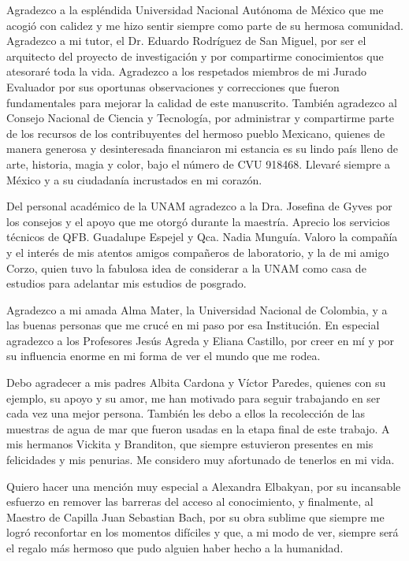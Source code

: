\begin{acknowledgements}
Agradezco a la espléndida Universidad Nacional Autónoma de México que me acogió con calidez y me hizo sentir siempre como parte de su hermosa comunidad. Agradezco a mi tutor, el Dr. Eduardo Rodríguez de San Miguel, por ser el arquitecto del proyecto de investigación y por compartirme conocimientos que atesoraré toda la vida. Agradezco a los respetados miembros de mi Jurado Evaluador por sus oportunas observaciones y correcciones que fueron fundamentales para mejorar la calidad de este manuscrito. También agradezco al Consejo Nacional de Ciencia y Tecnología, por administrar y compartirme parte de los recursos de los contribuyentes del hermoso pueblo Mexicano, quienes de manera generosa y desinteresada financiaron mi estancia es su lindo país lleno de arte, historia, magia y color, bajo el número de CVU 918468. Llevaré siempre a México y a su ciudadanía incrustados en mi corazón. 

Del personal académico de la UNAM agradezco a la Dra. Josefina de Gyves por los consejos y el apoyo que me otorgó durante la maestría. Aprecio los servicios técnicos de QFB. Guadalupe Espejel y Qca. Nadia Munguía. Valoro la compañía y el interés de mis atentos amigos compañeros de laboratorio, y la de mi amigo Corzo, quien tuvo la fabulosa idea de considerar a la UNAM como casa de estudios para adelantar mis estudios de posgrado.

Agradezco a mi amada Alma Mater, la Universidad Nacional de Colombia, y a las buenas personas que me crucé en mi paso por esa Institución. En especial agradezco a los Profesores Jesús Agreda y Eliana Castillo, por creer en mí y por su influencia enorme en mi forma de ver el mundo que me rodea.

Debo agradecer a mis padres Albita Cardona y Víctor Paredes, quienes con su ejemplo, su apoyo y su amor, me han motivado para seguir trabajando en ser cada vez una mejor persona. También les debo a ellos la recolección de las muestras de agua de mar que fueron usadas en la etapa final de este trabajo. A mis hermanos Vickita y Branditon, que siempre estuvieron presentes en mis felicidades y mis penurias. Me considero muy afortunado de tenerlos en mi vida. 

Quiero hacer una mención muy especial a Alexandra Elbakyan, por su incansable esfuerzo en remover las barreras del acceso al conocimiento, y finalmente, al Maestro de Capilla Juan Sebastian Bach, por su obra sublime que siempre me logró reconfortar en los momentos difíciles y que, a mi modo de ver, siempre será el regalo más hermoso que pudo alguien haber hecho a la humanidad.
\end{acknowledgements}